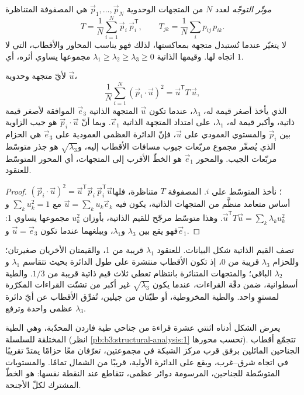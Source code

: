 \begin{definition}\label{def:b3:structural-analysis:orientation-tensor}
\emph{موتّر التوجّه} لعدد $N$ من المتجهات الوحدوية
$\vec p_1, \dots, \vec p_N$ هي المصفوفة المتناظرة
\[
  T = \frac1N\sum_{i=1}^N \vec p_i\,\vec p_i^{\mathsf T},
  \qquad T_{jk} = \frac1N\sum_i p_{ij}\,p_{ik} .
\]
لا يتغيّر عندما تُستبدل متجهة بمعاكستها، لذلك فهو يناسب
المحاور والأقطاب، التي لا اتجاه لها. وقيمها الذاتية $\lambda_1 \ge \lambda_2
\ge \lambda_3 \ge 0$ مجموعها يساوي أثره، أي $1$.
\end{definition}

\begin{theorem}\label{thm:b3:structural-analysis:tensor}
لأيّ متجهة وحدوية $\vec u$،
\[
  \frac1N\sum_{i=1}^N (\vec p_i\cdot\vec u)^2 = \vec u^{\mathsf T}T\,\vec u ,
\]
الذي يأخذ أصغر قيمة له، $\lambda_3$، عندما تكون $\vec u$ المتجهة الذاتية
$\vec e_3$ الموافقة لأصغر قيمة ذاتية، وأكبر قيمة له، $\lambda_1$، على امتداد
المتجهة الذاتية $\vec e_1$. وبما أنّ $\vec p_i\cdot\vec u$ هو جيب الزاوية
بين $\vec p_i$ والمستوي العمودي على $\vec u$، فإنّ الدائرة العظمى
العمودية على $\vec e_3$ هي الحزام الذي يُصغّر مجموع مربّعات
جيوب مسافات الأقطاب إليه، و$\sqrt{\lambda_3}$ هو
جذر متوسّط مربّعات الجيب. والمحور $\vec e_1$ هو الخطّ الأقرب إلى المتجهات،
أي المحور المتوسّط للعنقود.
\end{theorem}

\begin{proof}
$(\vec p_i\cdot\vec u)^2 = \vec u^{\mathsf T}\vec p_i\,\vec p_i^{\mathsf T}\vec
u$؛ نأخذ المتوسّط على $i$. المصفوفة $T$ متناظرة، فلها أساس متعامد منظَّم
من المتجهات الذاتية، يكون فيه $\vec u = \sum_k u_k\vec e_k$ مع $\sum_k
u_k^2 = 1$ و$\vec u^{\mathsf T}T\vec u = \sum_k\lambda_k u_k^2$. وهذا متوسّط
مرجّح للقيم الذاتية، بأوزان $u_k^2$ مجموعها يساوي 1: فهو
يقع بين $\lambda_3$ و$\lambda_1$، ويبلغهما عندما تكون $\vec u = \vec
e_3$ و$\vec e_1$.
\end{proof}

تصف القيم الذاتية شكل البيانات. للعنقود $\lambda_1$ قريبة من
1، والقيمتان الأخريان صغيرتان؛ وللحزام $\lambda_3$ قريبة من 0، إذ تكون الأقطاب
منتشرة على طول الدائرة بحيث تتقاسم $\lambda_1$ و$\lambda_2$ الباقي؛
والمتجهات المتناثرة بانتظام تعطي ثلاث قيم ذاتية قريبة من $1/3$. والطية
أسطوانية، ضمن دقّة القراءات، عندما يكون $\sqrt{\lambda_3}$
غير أكبر من تشتّت القراءات المكرّرة لمستوٍ واحد. والطية المخروطية،
أو طيّتان من جيلين، تُفرِّق الأقطاب عن أيّ دائرة عظمى واحدة
وترفع $\lambda_3$.

يعرض الشكل أدناه اثنتي عشرة قراءة من جناحي طية فاردن المحدّبة،
وهي الطية المختلقة للسلسلة (انظر \cref{pb:b3:structural-analysis:1}
تحسب محورها). تتجمّع أقطاب الجناحين المائلين برفق قرب مركز
الشبكة في مجموعتين، تعرّفان معًا حزامًا يمتدّ تقريبًا في اتجاه شرق–غرب،
ويقع  على الدائرة الأولية، قريبًا من الشمال تمامًا. والمستويات
المتوسّطة للجناحين، المرسومة دوائر عظمى، تتقاطع عند النقطة نفسها:
 هو الخطّ المشترك لكلّ الأجنحة.

